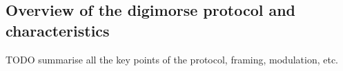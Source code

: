 \documentclass[a4paper]{tufte-handout}
\begin{document}
\subsection{Overview of the digimorse protocol and characteristics}

TODO summarise all the key points of the protocol, framing, modulation, etc.

\pagebreak


\end{document}
